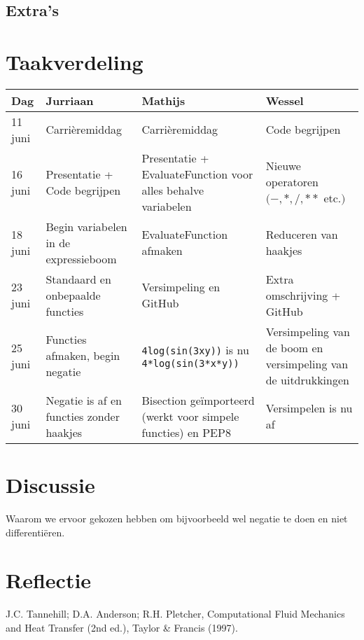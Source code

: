 \documentclass[12pt]{article}
\begin{document}
\subsection{Extra's}

\newpage
\section{Taakverdeling}

\begin{center}
    \begin{tabular}{ | l | p{4cm}  | p{4cm} | p{4cm} |}
    \hline
    Dag & Jurriaan & Mathijs & Wessel \\ \hline
    11 juni & Carri\`eremiddag & Carri\`eremiddag & Code begrijpen \\ \hline
    16 juni & Presentatie + Code begrijpen & Presentatie + EvaluateFunction voor alles behalve variabelen & Nieuwe operatoren  $(-, *, /, **$ etc.$)$ \\ \hline
    18 juni & Begin variabelen in de expressieboom & EvaluateFunction afmaken & Reduceren van haakjes \\ \hline
    23 juni & Standaard en onbepaalde functies & Versimpeling en GitHub & Extra omschrijving + GitHub \\ \hline
    25 juni & Functies afmaken, begin negatie & \texttt{4log(sin(3xy))} is nu \texttt{4*log(sin(3*x*y))} & Versimpeling van de boom en versimpeling van de uitdrukkingen \\ \hline
    30 juni & Negatie is af en functies zonder haakjes & Bisection ge\"{i}mporteerd (werkt voor simpele functies) en PEP8 & Versimpelen is nu af \\
    \hline
    \end{tabular}
\end{center}

\section{Discussie}
Waarom we ervoor gekozen hebben om bijvoorbeeld wel negatie te doen en niet differenti\"eren.


\section{Reflectie}

\begin{thebibliography}{9}
J.C. Tannehill; D.A. Anderson; R.H. Pletcher, Computational Fluid Mechanics and Heat Transfer (2nd ed.), Taylor \& Francis (1997).
\end{thebibliography}
\end{document}
